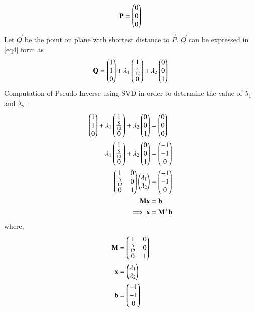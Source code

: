 \documentclass[journal,12pt,twocolumn]{IEEEtran}
\begin{document}
\begin{equation}\label{eq5}
	\mathbf{P} = \begin{pmatrix}0\\0\\0\end{pmatrix}
\end{equation}
Let $\vec{Q}$ be the point on plane with shortest distance to $\vec{P}$.
$\vec{Q}$ can be expressed in \eqref{eq4} form as
\begin{align}\label{eq6}
	\mathbf{Q} = \begin{pmatrix}1\\1\\0\end{pmatrix} + \lambda_1\begin{pmatrix}1\\\frac{5}{12}\\0\end{pmatrix} + \lambda_2\begin{pmatrix}0\\0\\1\end{pmatrix}
\end{align}
Computation of Pseudo Inverse using SVD in order to determine the value of $\lambda_1$ and $\lambda_2$ :
\begin{align}
	\label{eq7}\begin{pmatrix}1\\1\\0\end{pmatrix} + \lambda_1\begin{pmatrix}1\\\frac{5}{12}\\0\end{pmatrix} + \lambda_2\begin{pmatrix}0\\0\\1\end{pmatrix} &= \begin{pmatrix}0\\0\\0\end{pmatrix}\\\label{eq8}
	\lambda_1\begin{pmatrix}1\\\frac{5}{12}\\0\end{pmatrix} + \lambda_2\begin{pmatrix}0\\0\\1\end{pmatrix} &= \begin{pmatrix}-1\\-1\\0\end{pmatrix}\\\label{eq9}
	\begin{pmatrix}1 & 0\\\frac{5}{12} & 0\\0 & 1\end{pmatrix} \begin{pmatrix}\lambda_1 \\ \lambda_2\end{pmatrix} &=\begin{pmatrix}-1\\-1\\0\end{pmatrix}\\\label{eq10}
	\mathbf{M}\mathbf{x} &= \mathbf{b}\\\label{eq11} 
	\implies\mathbf{x} &= \mathbf{M}^{+}\mathbf{b}
\end{align}
where,
\begin{align}
    \mathbf{M} &= \begin{pmatrix}1 & 0\\\frac{5}{12} & 0\\0 & 1\end{pmatrix} \\
    \mathbf{x} &= \begin{pmatrix}\lambda_1 \\ \lambda_2\end{pmatrix} \\
    \mathbf{b} &= \begin{pmatrix}-1\\-1\\0\end{pmatrix}
\end{align}
\end{document}
